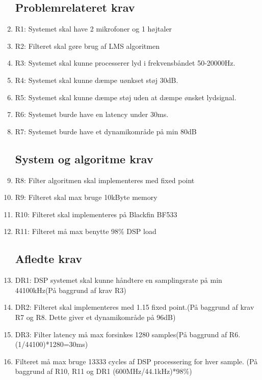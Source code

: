 \begin{enumerate}
	
	\subsection{Problemrelateret krav}
	\item R1: Systemet skal have 2 mikrofoner og 1 højtaler
	
	\item R2: Filteret skal gøre brug af LMS algoritmen
	
	\item R3: Systemet skal kunne processerer lyd i frekvensbåndet 50-20000Hz. 
	
	\item R4: Systemet skal kunne dæmpe uønkset støj 30dB.
	
	\item R5: Systemet skal kunne dæmpe støj uden at dæmpe ønsket lydsignal.
	
	\item R6: Systemet burde have en latency under 30ms.
	
	\item R7: Systemet burde have et dynamikområde på min 80dB
	
	\subsection{System og algoritme krav}
	
	\item R8: Filter algoritmen skal implementeres med fixed point 
	
	\item R9: Filteret skal max bruge 10kByte memory
	
	\item R10: Filteret skal implementeres på Blackfin BF533
	
	\item R11: Filteret må max benytte 98\% DSP load

	\subsection{Afledte krav}
	
	\item DR1: DSP systemet skal kunne håndtere en samplingsrate på min 44100kHz(På baggrund af krav R3) 
	
	\item DR2: Filteret skal implementeres med 1.15 fixed point.(På baggrund af krav R7 og R8. Dette giver et dynamikområde på 96dB)
	
	\item DR3: Filter latency må max forsinkes 1280 samples(På baggrund af R6. (1/44100)*1280=30ms)
	
	\item Filteret må max bruge 13333 cycles af DSP processering for hver sample. (På baggrund af R10, R11 og DR1 (600MHz/44.1kHz)*98\%)
	
\end{enumerate}
